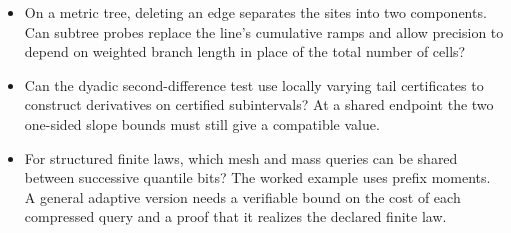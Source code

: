 \begin{itemize}
\item On a metric tree, deleting an edge separates the sites into two
components. Can subtree probes replace the line's cumulative ramps and allow
precision to depend on weighted branch length in place of the total number
of cells?
\item Can the dyadic second-difference test use locally varying tail certificates
to construct derivatives on certified subintervals? At a shared endpoint the
two one-sided slope bounds must still give a compatible value.
\item For structured finite laws, which mesh and mass queries can be shared
between successive quantile bits? The worked example uses prefix moments.
A general adaptive version needs a verifiable bound on the cost of each
compressed query and a proof that it realizes the declared finite law.
\end{itemize}
